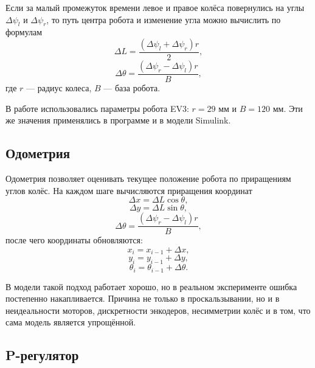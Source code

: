 \documentclass[a4paper, 12pt]{article}
\begin{document}
Если за малый промежуток времени левое и правое колёса повернулись на углы $\Delta\psi_l$ и $\Delta\psi_r$, то путь центра робота и изменение угла можно вычислить по формулам
\begin{equation}
\Delta L = \frac{(\Delta\psi_l + \Delta\psi_r)r}{2},
\end{equation}
\begin{equation}
\Delta\theta = \frac{(\Delta\psi_r - \Delta\psi_l)r}{B},
\end{equation}
где $r$ --- радиус колеса, $B$ --- база робота.

В работе использовались параметры робота EV3: $r = 29$ мм и $B = 120$ мм. Эти же значения применялись в программе и в модели Simulink.

\subsection{Одометрия}

Одометрия позволяет оценивать текущее положение робота по приращениям углов колёс. На каждом шаге вычисляются приращения координат
\begin{equation}
\Delta x = \Delta L \cos\theta,
\end{equation}
\begin{equation}
\Delta y = \Delta L \sin\theta,
\end{equation}
\begin{equation}
\Delta\theta = \frac{(\Delta\psi_r - \Delta\psi_l)r}{B},
\end{equation}
после чего координаты обновляются:
\begin{equation}
x_i = x_{i-1} + \Delta x,
\end{equation}
\begin{equation}
y_i = y_{i-1} + \Delta y,
\end{equation}
\begin{equation}
\theta_i = \theta_{i-1} + \Delta\theta.
\end{equation}

В модели такой подход работает хорошо, но в реальном эксперименте ошибка постепенно накапливается. Причина не только в проскальзывании, но и в неидеальности моторов, дискретности энкодеров, несимметрии колёс и в том, что сама модель является упрощённой.

\subsection{P-регулятор}
\end{document}
